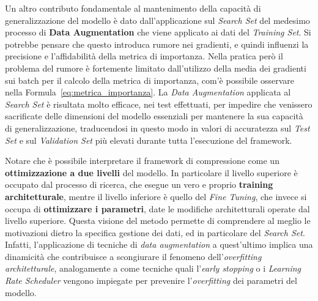 Un altro contributo fondamentale al mantenimento della capacità di generalizzazione del modello è dato dall'applicazione sul \textit{Search Set} del medesimo processo di \textbf{Data Augmentation} che viene applicato ai dati del \textit{Training Set}. Si potrebbe pensare che questo introduca rumore nei gradienti, e quindi influenzi la precisione e l'affidabilità della metrica di importanza. Nella pratica però il problema del rumore è fortemente limitato dall'utilizzo della media dei gradienti sui batch per il calcolo della metrica di importanza, com'è possibile osservare nella Formula~\eqref{eq:metrica_importanza}. La \textit{Data Augmentation} applicata al \textit{Search Set} è risultata molto efficace, nei test effettuati, per impedire che venissero sacrificate delle dimensioni del modello essenziali per mantenere la sua capacità di generalizzazione, traducendosi in questo modo in valori di accuratezza sul \textit{Test Set} e sul \textit{Validation Set} più elevati durante tutta l'esecuzione del framework. \par
Notare che è possibile interpretare il framework di compressione come un \textbf{ottimizzazione a due livelli} del modello. In particolare il livello superiore è occupato dal processo di ricerca, che esegue un vero e proprio \textbf{training architetturale}, mentre il livello inferiore è quello del \textit{Fine Tuning}, che invece si occupa di \textbf{ottimizzare i parametri}, date le modifiche architetturali operate dal livello superiore. Questa visione del metodo permette di comprendere al meglio le motivazioni dietro la specifica gestione dei dati, ed in particolare del \textit{Search Set}. Infatti, l'applicazione di tecniche di \textit{data augmentation} a quest'ultimo implica una dinamicità che contribuisce a scongiurare il fenomeno dell'\textit{overfitting architetturale}, analogamente a come tecniche quali l'\textit{early stopping} o i \textit{Learning Rate Scheduler} vengono impiegate per prevenire l'\textit{overfitting} dei parametri del modello.

